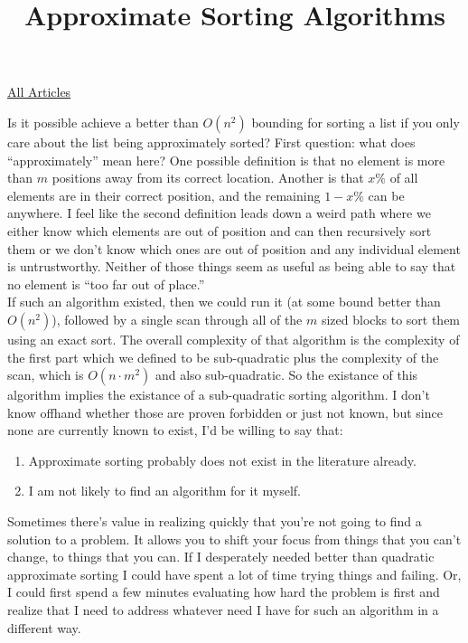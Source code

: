 \documentclass{article}
\title{Approximate Sorting Algorithms}
\begin{document}
\maketitle
\begin{center}
\href{../index.html}{All Articles}
\end{center}

Is it possible achieve a better than $O(n^2)$ bounding for sorting a list if you only care about the list being approximately sorted? First question: what does ``approximately'' mean here? One possible definition is that no element is more than $m$ positions away from its correct location. Another is that $x\%$ of all elements are in their correct position, and the remaining $1-x\%$ can be anywhere. I feel like the second definition leads down a weird path where we either know which elements are out of position and can then recursively sort them or we don't know which ones are out of position and any individual element is untrustworthy. Neither of those things seem as useful as being able to say that no element is ``too far out of place.''\\

If such an algorithm existed, then we could run it (at some bound better than $O(n^2)$), followed by a single scan through all of the $m$ sized blocks to sort them using an exact sort. The overall complexity of that algorithm is the complexity of the first part which we defined to be sub-quadratic plus the complexity of the scan, which is $O(n \cdot m^2)$ and also sub-quadratic. So the existance of this algorithm implies the existance of a sub-quadratic sorting algorithm. I don't know offhand whether those are proven forbidden or just not known, but since none are currently known to exist, I'd be willing to say that:\\

\begin{enumerate}[1.]
\item Approximate sorting probably does not exist in the literature already.
\item I am not likely to find an algorithm for it myself.
\end{enumerate}

Sometimes there's value in realizing quickly that you're not going to find a solution to a problem. It allows you to shift your focus from things that you can't change, to things that you can. If I desperately needed better than quadratic approximate sorting I could have spent a lot of time trying things and failing. Or, I could first spend a few minutes evaluating how hard the problem is first and realize that I need to address whatever need I have for such an algorithm in a different way.\\
\end{document}
